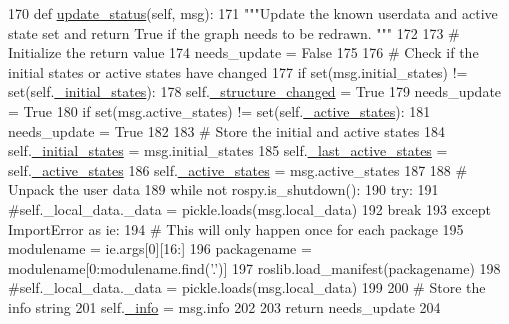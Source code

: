 \begin{DoxyCode}
170     \textcolor{keyword}{def }\hyperlink{classsmacc__viewer_1_1ContainerNode_a91546f29baa378bb672873b3caf05ef2}{update\_status}(self, msg):
171         \textcolor{stringliteral}{"""Update the known userdata and active state set and return True if the graph needs to be redrawn.
      """}
172 
173         \textcolor{comment}{# Initialize the return value}
174         needs\_update = \textcolor{keyword}{False}
175 
176         \textcolor{comment}{# Check if the initial states or active states have changed}
177         \textcolor{keywordflow}{if} set(msg.initial\_states) != set(self.\hyperlink{classsmacc__viewer_1_1ContainerNode_a3d5c9521ab4377e7b94e437d4f7e5a83}{\_initial\_states}):
178             self.\hyperlink{classsmacc__viewer_1_1ContainerNode_a8d17a3a75ce519ef442b9bc94a801130}{\_structure\_changed} = \textcolor{keyword}{True}
179             needs\_update = \textcolor{keyword}{True}
180         \textcolor{keywordflow}{if} set(msg.active\_states) != set(self.\hyperlink{classsmacc__viewer_1_1ContainerNode_ad4607ee25bd9dd1f1c54ac72ca1ba5aa}{\_active\_states}):
181             needs\_update = \textcolor{keyword}{True}
182 
183         \textcolor{comment}{# Store the initial and active states}
184         self.\hyperlink{classsmacc__viewer_1_1ContainerNode_a3d5c9521ab4377e7b94e437d4f7e5a83}{\_initial\_states} = msg.initial\_states
185         self.\hyperlink{classsmacc__viewer_1_1ContainerNode_a627a2895916d1815096914f67a612af2}{\_last\_active\_states} = self.\hyperlink{classsmacc__viewer_1_1ContainerNode_ad4607ee25bd9dd1f1c54ac72ca1ba5aa}{\_active\_states}
186         self.\hyperlink{classsmacc__viewer_1_1ContainerNode_ad4607ee25bd9dd1f1c54ac72ca1ba5aa}{\_active\_states} = msg.active\_states
187 
188         \textcolor{comment}{# Unpack the user data}
189         \textcolor{keywordflow}{while} \textcolor{keywordflow}{not} rospy.is\_shutdown():
190             \textcolor{keywordflow}{try}:
191                 \textcolor{comment}{#self.\_local\_data.\_data = pickle.loads(msg.local\_data)}
192                 \textcolor{keywordflow}{break}
193             \textcolor{keywordflow}{except} ImportError \textcolor{keyword}{as} ie:
194                 \textcolor{comment}{# This will only happen once for each package}
195                 modulename = ie.args[0][16:]
196                 packagename = modulename[0:modulename.find(\textcolor{stringliteral}{'.'})]
197                 roslib.load\_manifest(packagename)
198                 \textcolor{comment}{#self.\_local\_data.\_data = pickle.loads(msg.local\_data)}
199 
200         \textcolor{comment}{# Store the info string}
201         self.\hyperlink{classsmacc__viewer_1_1ContainerNode_a1e3dcba4beb3738d72e57805b7d2474b}{\_info} = msg.info
202 
203         \textcolor{keywordflow}{return} needs\_update
204 
\end{DoxyCode}
